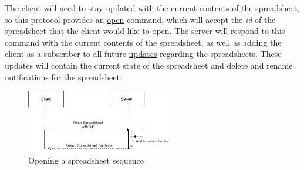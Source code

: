 The client will need to stay updated with the current contents of the 
spreadsheet, so this protocol provides an \hyperref[sec:message:open]{open} 
command, which will accept the \emph{id} of the spreadsheet that the client 
would like to open. The server will respond to this command with the current 
contents of the spreadsheet, as well as adding the client as a subscriber to 
all future \hyperref[sec:message:updates]{updates} regarding the spreadsheets. These updates will contain the 
current state of the spreadsheet and delete and rename notifications for the 
spreadsheet. 

\begin{figure}[H]
    \begin{center}
        \includegraphics[width=2.5in]{Figures/open_sprd.png}
        \caption{Opening a spreadsheet sequence}
    \end{center}
\end{figure}